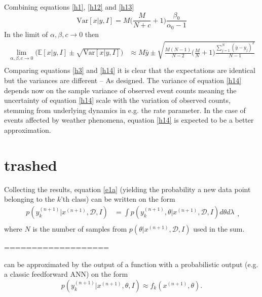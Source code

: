 Combining equations \eqref{h1}, \eqref{h12} and \eqref{h13}
\begin{equation}
	\text{Var}[x|y,I]=M\bigg(\frac{M}{N+c}+1\bigg)\frac{\beta_0}{\alpha_0-1}
\end{equation}
In the limit of $\alpha,\beta,c\rightarrow 0$ then
\begin{equation}
	\begin{split}
		\lim\limits_{\alpha,\beta,c\rightarrow 0}\big(\mathbb{E}[x|y,I]\pm \sqrt{\text{Var}[x|y,I]}\big) &\approx M\bar{y}\pm \sqrt{\frac{M(N-1)}{N-2}\bigg(\frac{M}{N}+1\bigg)\frac{\sum_{j=1}^{N}(\bar{y}-y_j)^2}{N-1}}\\ 
	\end{split}
	\label{h14}
\end{equation}
Comparing equations \eqref{h3} and \eqref{h14} it is clear that the expectations are identical but the variances are different -- As designed. The variance of equation \eqref{h14} depends now on the sample variance of observed event counts meaning the uncertainty of equation \eqref{h14} scale with the variation of observed counts, stemming from underlying dynamics in e.g. the rate parameter. In the case of events affected by weather phenomena, equation \eqref{h14} is expected to be a better approximation.


\chapter{trashed}

Collecting the results, equation \eqref{e1a} (yielding the probability a new data point belonging to the $k$'th class) can be written on the form
\begin{equation}
	\begin{split}
		p(y^{(n+1)}_k|x^{(n+1)},\mathcal{D},I) &= \int p(y^{(n+1)}_k,\theta|x^{(n+1)},\mathcal{D},I)d\theta d\lambda\\
	\end{split},
	\label{e2a}
\end{equation}
where $N$ is the number of samples from $p(\theta|x^{(n+1)},\mathcal{D},I)$ used in the sum.



===================


can be approximated by the output of a function with a probabilistic output (e.g. a classic feedforward ANN) on the form~\citep{Saerens2002}
\begin{equation}
	p(y_k^{(n+1)}|x^{(n+1)},\theta,I)\approx f_k(x^{(n+1)},\theta).
	\label{out}
\end{equation}


